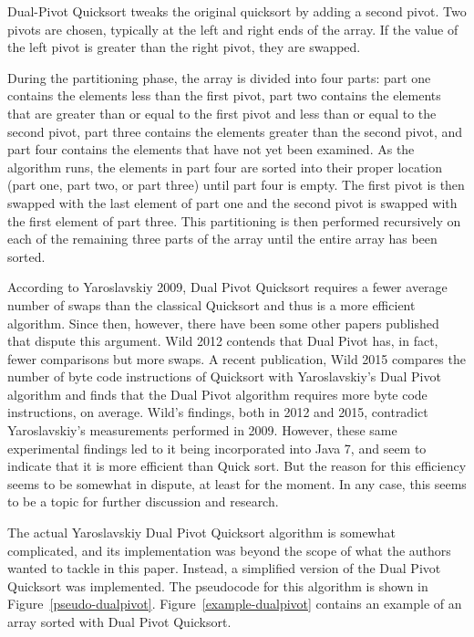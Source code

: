 \documentclass{article}
\begin{document}
Dual-Pivot Quicksort tweaks the original quicksort by adding a second pivot. Two pivots are chosen, 
typically at the left and right ends of the array. If the value of the left pivot is greater than the right 
pivot, they are swapped.  

During the partitioning phase, the array is divided into four parts:
part one contains the elements less than the first pivot, part two contains the elements that are 
greater than or equal to the first pivot and less than or equal to the second pivot, part three contains 
the elements greater than the second pivot, and part four contains the elements that have not
yet been examined. As the algorithm runs, the elements in part four are sorted into their proper
location (part one, part two, or part three) until part four is empty. The first pivot is then swapped 
with the last element of part one and the second pivot is swapped with the first element of part 
three. This partitioning is then performed recursively on each of the remaining three parts of the 
array until the entire array has been sorted. 

According to Yaroslavskiy 2009\cite{Yaroslavskiy09}, Dual Pivot Quicksort requires a fewer 
average number of swaps than the classical Quicksort and thus is a more efficient algorithm.
Since then, however, there have been some other papers published that dispute this argument.
Wild 2012\cite{Wild12} contends that Dual Pivot has, in fact, fewer comparisons but 
more swaps. A recent publication, Wild 2015\cite{Wild15} compares the number of byte code
instructions of Quicksort with Yaroslavskiy's Dual Pivot algorithm and finds that the Dual Pivot
algorithm requires more byte code instructions, on average. Wild's findings, both in 2012 and 2015,
contradict Yaroslavskiy's measurements performed in 2009. However, these same experimental 
findings led to it being incorporated into Java 7, and seem to indicate that it is more efficient than 
Quick sort. But the reason for this efficiency seems to be somewhat in dispute, at least for the moment. In any case, this seems to be a topic for further discussion and research.

The actual Yaroslavskiy Dual Pivot Quicksort algorithm is somewhat complicated, and
its implementation was beyond the scope of what the authors wanted to tackle in this paper. 
Instead, a simplified version of the Dual Pivot Quicksort was implemented. The pseudocode for
this algorithm is shown in Figure~\ref{pseudo-dualpivot}. Figure~\ref{example-dualpivot} contains 
an example of an array sorted with Dual Pivot Quicksort.
\end{document}
